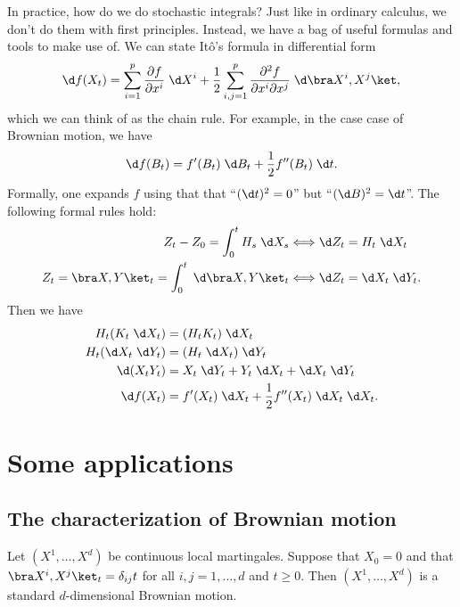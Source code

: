 \documentclass[a4paper]{article}
\begin{document}
In practice, how do we do stochastic integrals? Just like in ordinary calculus, we don't do them with first principles. Instead, we have a bag of useful formulas and tools to make use of. We can state It\^o's formula in differential form
\[
  \d f(X_t) = \sum_{i = 1}^p \frac{\partial f}{\partial x^i} \;\d X^i + \frac{1}{2} \sum_{i, j = 1}^p \frac{\partial^2 f}{\partial x^i\partial x^j} \;\d \bra X^i, X^j\ket,
\]
which we can think of as the chain rule. For example, in the case case of Brownian motion, we have
\[
  \d f(B_t) = f'(B_t) \;\d B_t + \frac{1}{2} f''(B_t) \;\d t.
\]
Formally, one expands $f$ using that that ``$(\d t)^2 = 0$'' but ``$(\d B)^2 = \d t$''. The following formal rules hold:
\begin{align*}
  Z_t - Z_0 = \int_0^t H_s \;\d X_s &\Longleftrightarrow \d Z_t = H_t \;\d X_t\\
  Z_t = \bra X, Y\ket_t = \int_0^t \;\d \bra X, Y\ket_t &\Longleftrightarrow \d Z_t = \d X_t \;\d Y_t.
\end{align*}
Then we have
\begin{align*}
  H_t(K_t \;\d X_t) &= (H_t K_t)\;\d X_t\\
  H_t (\d X_t \;\d Y_t) &= (H_t \;\d X_t)\;\d Y_t\\
  \d (X_t Y_t) &= X_t \;\d Y_t + Y_t \;\d X_t + \d X_t \;\d Y_t\\
  \d f(X_t) &= f'(X_t) \;\d X_t + \frac{1}{2} f''(X_t) \;\d X_t\;\d X_t.
\end{align*}

\section{Some applications}
\subsection{The  characterization of Brownian motion} %
\begin{thm}
  Let $(X^1, \ldots, X^d)$ be continuous local martingales. Suppose that $X_0 = 0$ and that $\bra X^i, X^j\ket_t = \delta_{ij} t$ for all $i, j = 1, \ldots, d$ and $t \geq 0$. Then $(X^1, \ldots, X^d)$ is a standard $d$-dimensional Brownian motion.
\end{thm}
\end{document}
